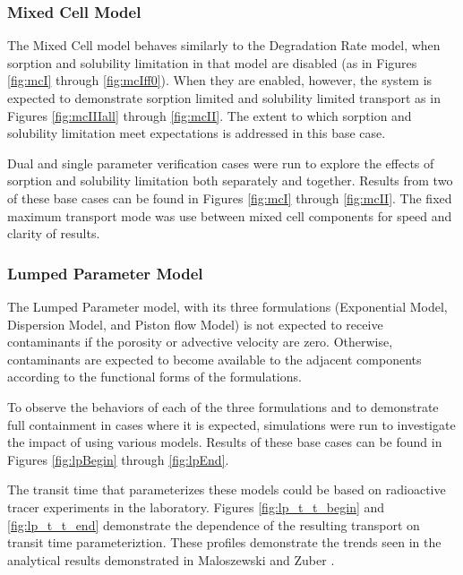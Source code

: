 \subsubsection{Mixed Cell Model}
The Mixed Cell model behaves similarly to the Degradation Rate model, when 
sorption and solubility limitation in that model are disabled (as in Figures 
\ref{fig:mcI} through \ref{fig:mcIff0}). When they are enabled, however, the 
system is expected to demonstrate sorption limited and solubility limited 
transport as in Figures \ref{fig:mcIIIall} through \ref{fig:mcII}. The extent 
to which sorption and solubility limitation meet expectations is addressed in 
this base case.  

Dual and single parameter verification cases were run to explore the effects of 
sorption and solubility limitation both separately and together.  Results from 
two of these base cases can be found in Figures \ref{fig:mcI} through 
\ref{fig:mcII}.
The fixed maximum transport mode was use between mixed cell components for speed 
and clarity of results.


\FloatBarrier

\subsubsection{Lumped Parameter Model}
The Lumped Parameter model, with its three formulations (Exponential Model, 
Dispersion Model, and Piston flow Model) is not expected to receive 
contaminants if the porosity or advective velocity are zero. Otherwise, 
contaminants are expected to  become available to the adjacent components 
according to the functional forms of the formulations. 

To observe the behaviors of each of the three formulations and to demonstrate 
full containment in cases where it is expected, simulations were run to 
investigate the impact of using various models. Results of these base cases can be found in Figures 
\ref{fig:lpBegin} through \ref{fig:lpEnd}.



The transit time that parameterizes these models could be based on radioactive 
tracer experiments in the laboratory. Figures \ref{fig:lp_t_t_begin} 
and \ref{fig:lp_t_t_end} demonstrate the dependence of the resulting transport on 
transit time parameteriztion. These profiles demonstrate the trends seen in the 
analytical results demonstrated in Maloszewski and Zuber 
\cite{maloszewski_lumped_1996}.

